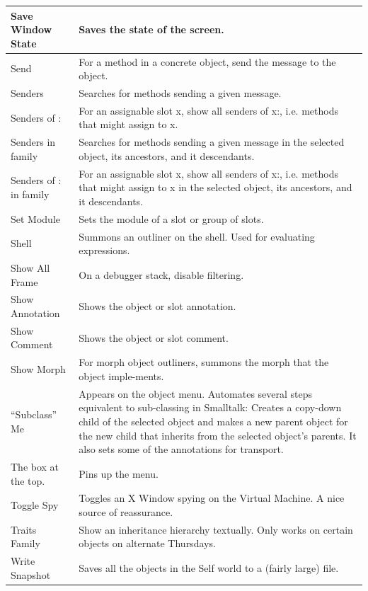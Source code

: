 \documentclass[letterpaper,10pt,english]{sphinxmanual}
\begin{document}
\begin{longtable}{p{5cm} p{10cm}}
Save Window State
 & 
Saves the state of the screen.
\\\hline

Send
 & 
For a method in a concrete object, send the message to the object.
\\\hline

Senders
 & 
Searches for methods sending a given message.
\\\hline

Senders of :
 & 
For an assignable slot x, show all senders of x:, i.e. methods that might assign to x.
\\\hline

Senders in family
 & 
Searches for methods sending a given message in the selected object, its ancestors, and it descendants.
\\\hline

Senders of : in family
 & 
For an assignable slot x, show all senders of x:, i.e. methods that might assign to x in the selected object, its ancestors, and it descendants.
\\\hline

Set Module
 & 
Sets the module of a slot or group of slots.
\\\hline

Shell
 & 
Summons an outliner on the shell. Used for evaluating expressions.
\\\hline

Show All Frame
 & 
On a debugger stack, disable filtering.
\\\hline

Show Annotation
 & 
Shows the object or slot annotation.
\\\hline

Show Comment
 & 
Shows the object or slot comment.
\\\hline

Show Morph
 & 
For morph object outliners, summons the morph that the object imple-ments.
\\\hline

“Subclass” Me
 & 
Appears on the object menu. Automates several steps equivalent to sub-classing in Smalltalk: Creates a copy-down child of the selected object and makes a new parent object for the new child that inherits from the selected object’s parents. It also sets some of the annotations for transport.
\\\hline

The box at the top.
 & 
Pins up the menu.
\\\hline

Toggle Spy
 & 
Toggles an X Window spying on the Virtual Machine. A nice source of reassurance.
\\\hline

Traits Family
 & 
Show an inheritance hierarchy textually. Only works on certain objects on alternate Thursdays.
\\\hline

Write Snapshot
 & 
Saves all the objects in the Self world to a (fairly large) file.
\\\hline
\end{longtable}
\end{document}
